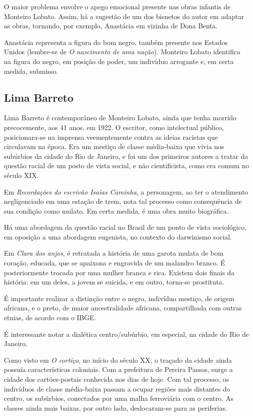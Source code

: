 O maior problema envolve o apego emocional presente nas obras infantis de Monteiro Lobato. Assim, há a sugestão de um dos bisnetos do autor em adaptar as obras, tornando, por exemplo, Anastácia em vizinha de Dona Benta.

Anastácia representa a figura do bom negro, também presente nos Estados Unidos (lembre-se de \textit{O nascimento de uma nação}). Monteiro Lobato identifica na figura do negro, em posição de poder, um indivíduo arrogante e, em certa medida, submisso.

\subsection{Lima Barreto}

Lima Barreto é contemporâneo de Monteiro Lobato, ainda que tenha morrido precocemente, aos 41 anos, em 1922. O escritor, como intelectual público, posicionara-se na imprensa veementemente contra as ideias racistas que circulavam na época. Era um mestiço de classe média-baixa que vivia nos subúrbios da cidade do Rio de Janeiro, e foi um dos primeiros autores a tratar da questão racial de um posto de vista social, e não cientificista, como era comum no século XIX.

Em \textit{Recordações do escrivão Isaías Caminha}, a personagem, ao ter o atendimento negligenciado em uma estação de trem, nota tal processo como consequência de sua condição como mulato. Em certa medida, é uma obra muito biográfica.

Há uma abordagem da questão racial no Brasil de um ponto de vista sociológico, em oposição a uma abordagem eugenista, no contexto do darwinismo social.

Em \textit{Clara dos anjos}, é retratada a história de uma garota mulata de bom coração, educada, que se apaixona e engravida de um malandro branco. É posteriormente trocada por uma mulher branca e rica. Existem dois finais da história: em um deles, a jovem se suicida, e em outro, torna-se prostituta.

É importante realizar a distinção entre o negro, indivíduo mestiço, de origem africana, e o preto, de maior ancestralidade africana, compartilhada com outras etnias, de acordo com o IBGE.

É interessante notar a dialética centro/subúrbio, em especial, na cidade do Rio de Janeiro.

Como visto em \textit{O cortiço}, no início do século XX, o traçado da cidade ainda possuía características coloniais. Com a prefeitura de Pereira Passos, surge a cidade dos cartões-postais conhecida nos dias de hoje. Com tal processo, os indivíduos de classe média-baixa passam a ocupar regiões mais distantes do centro, os subúrbios, conectados por uma malha ferroviária com o centro. As classes ainda mais baixas, por outro lado, deslocaram-se para as periferias.

